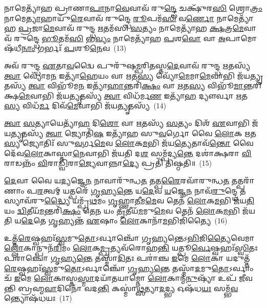 𑌨𑌾𑌮𑍇𑌤𑍍𑌯𑌾᳴𑌹 𑌪𑍍𑌰𑌾𑌣𑌾\-\ul{𑌪𑌾}\-𑌨𑌾\-\ul{𑌵𑍇}\-𑌵𑌾𑌵᳴ 𑌰𑍁\-\ul{𑌨𑍍𑌦𑍍𑌧𑍇} 𑌚𑌕𑍍𑌷𑍁᳴𑌰\-\ul{𑌸𑌿} 𑌶𑍍𑌰𑍋\-\ul{𑌤𑍍𑌰𑌂} 𑌨𑌾𑌮𑍇\-\ul{𑌤𑍍𑌯𑌾}\-𑌹𑌾𑌯𑍁᳴\-\ul{𑌰𑍇}\-𑌵𑌾𑌵᳴ 𑌰𑍁𑌨𑍍𑌦𑍍𑌧𑍇 \ul{𑌰𑍂}\-𑌪𑌮᳴\-\ul{𑌸𑌿} 𑌵\-\ul{𑌰𑍍𑌣𑍋} 𑌨𑌾𑌮𑍇𑌤𑍍𑌯𑌾᳴𑌹 \ul{𑌪𑍍𑌰}\-𑌜𑌾\-\ul{𑌮𑍇}\-𑌵𑌾𑌵᳴ 𑌰𑍁𑌨𑍍𑌦𑍍𑌧 \ul{𑌋}\-𑌤𑌮᳴𑌸𑌿 \ul{𑌸}\-𑌤𑍍𑌯𑌂 𑌨𑌾𑌮𑍇𑌤𑍍𑌯𑌾᳴𑌹 \ul{𑌕𑍍𑌷}\-𑌤𑍍𑌰\-\ul{𑌮𑍇}\-𑌵𑌾𑌵᳴ 𑌰𑍁𑌨𑍍𑌦𑍍𑌧𑍇 \ul{𑌭𑍂}\-𑌤𑌮᳴\-\ul{𑌸𑌿} 𑌭\-\ul{𑌵𑍍𑌯𑌂} 𑌨𑌾𑌮𑍇𑌤𑍍𑌯𑌾᳴𑌹 \ul{𑌪}\-𑌶\-\ul{𑌵𑍋} 𑌵𑌾 \ul{𑌅}\-𑌪𑌾𑌮𑍋𑌷᳴𑌧𑍀\-\ul{𑌨𑌾𑌂} 𑌗𑌰𑍍𑌭𑌃᳴ \ul{𑌪}\-𑌶𑍂\-\ul{𑌨𑍇}\-𑌵~(13)

𑌅𑌵᳴ 𑌰𑍁𑌨𑍍𑌦𑍍𑌧 \ul{𑌏}\-𑌤𑌾\-\ul{𑌵}\-𑌦𑍍𑌵𑍈 𑌪𑍁𑌰𑍁᳴𑌷\-\ul{𑌮𑍍𑌪}\-𑌰𑌿\-\ul{𑌤}\-𑌸𑍍𑌤\-\ul{𑌦𑍇}\-𑌵𑌾𑌵᳴ 𑌰𑍁𑌨𑍍𑌦𑍍𑌧 \ul{𑌋}\-𑌤𑌸𑍍𑌯᳴ \ul{𑌤𑍍𑌵𑌾} 𑌵𑍍𑌯𑍋᳴𑌮\-\ul{𑌨} 𑌇𑌤𑍍𑌯𑌾᳴\-\ul{𑌹𑍇}\-𑌯𑌂 𑌵𑌾 \ul{𑌋}\-𑌤\-\ul{𑌸𑍍𑌯} 𑌵𑍍𑌯𑍋᳴\-\ul{𑌮𑍇}\-𑌮𑌾\-\ul{𑌮𑍇}\-𑌵𑌾𑌭𑌿 𑌜᳴𑌯\-\ul{𑌤𑍍𑌯𑍃}\-𑌤𑌸𑍍𑌯᳴ \ul{𑌤𑍍𑌵𑌾} 𑌵𑌿𑌭𑍂᳴𑌮\-\ul{𑌨} 𑌇𑌤𑍍𑌯𑌾᳴\-\ul{𑌹𑌾}\-𑌨𑍍𑌤𑌰𑌿᳴\-\ul{𑌕𑍍𑌷𑌂} 𑌵𑌾 \ul{𑌋}\-𑌤\-\ul{𑌸𑍍𑌯} 𑌵𑌿𑌭𑍂᳴\-\ul{𑌮𑌾}\-𑌨𑍍𑌤𑌰𑌿᳴𑌕𑍍𑌷\-\ul{𑌮𑍇}\-𑌵𑌾𑌭𑌿 𑌜᳴𑌯\-\ul{𑌤𑍍𑌯𑍃}\-𑌤𑌸𑍍𑌯᳴ \ul{𑌤𑍍𑌵𑌾} 𑌵𑌿𑌧᳴𑌰𑍍𑌮\-\ul{𑌣} 𑌇𑌤𑍍𑌯𑌾᳴\-\ul{𑌹} 𑌦𑍍𑌯𑍗𑌰𑍍𑌵𑌾 \ul{𑌋}\-𑌤\-\ul{𑌸𑍍𑌯} 𑌵𑌿𑌧᳴\-\ul{𑌰𑍍𑌮} 𑌦𑌿𑌵᳴\-\ul{𑌮𑍇}\-𑌵𑌾𑌭𑌿 𑌜᳴𑌯\-\ul{𑌤𑍍𑌯𑍃}\-𑌤𑌸𑍍𑌯᳴~(14)

\-\ul{𑌤𑍍𑌵𑌾} \ul{𑌸}\-𑌤𑍍𑌯𑌾𑌯𑍇𑌤𑍍𑌯𑌾᳴\-\ul{𑌹} 𑌦𑌿\-\ul{𑌶𑍋} 𑌵𑌾 \ul{𑌋}\-𑌤𑌸𑍍𑌯᳴ \ul{𑌸}\-𑌤𑍍𑌯𑌂 𑌦𑌿𑌶᳴ \ul{𑌏}\-𑌵𑌾𑌭𑌿 𑌜᳴𑌯\-\ul{𑌤𑍍𑌯𑍃}\-𑌤𑌸𑍍𑌯᳴ \ul{𑌤𑍍𑌵𑌾} 𑌜𑍍𑌯𑍋𑌤𑌿᳴\-\ul{𑌷} 𑌇𑌤𑍍𑌯𑌾᳴𑌹 𑌸𑍁\-\ul{𑌵}\-𑌰𑍍𑌗𑍋 𑌵𑍈 \ul{𑌲𑍋}\-𑌕 \ul{𑌋}\-𑌤\-\ul{𑌸𑍍𑌯} 𑌜𑍍𑌯𑍋𑌤𑌿𑌃᳴ 𑌸𑍁\-\ul{𑌵}\-𑌰𑍍𑌗\-\ul{𑌮𑍇}\-𑌵 \ul{𑌲𑍋}\-𑌕\-\ul{𑌮}\-𑌭𑌿 𑌜᳴𑌯\-\ul{𑌤𑍍𑌯𑍇}\-𑌤𑌾𑌵᳴\-\ul{𑌨𑍍𑌤𑍋} 𑌵𑍈 𑌦𑍇᳴𑌵\-\ul{𑌲𑍋}\-𑌕𑌾𑌸𑍍𑌤𑌾\-\ul{𑌨𑍇}\-𑌵𑌾𑌭𑌿 𑌜᳴𑌯𑌤𑌿 𑌦\-\ul{𑌶} 𑌸𑌮𑍍𑌪᳴𑌦𑍍𑌯\-\ul{𑌨𑍍𑌤𑍇} 𑌦𑌶𑌾॑𑌕𑍍𑌷𑌰𑌾 \ul{𑌵𑌿}\-𑌰𑌾𑌡𑌨𑍍𑌨𑌂᳴ \ul{𑌵𑌿}\-𑌰𑌾\-\ul{𑌡𑍍𑌵𑌿}\-𑌰𑌾\-\ul{𑌜𑍍𑌯𑍇}\-𑌵𑌾𑌨𑍍𑌨𑌾\-\ul{𑌦𑍍𑌯𑍇} 𑌪𑍍𑌰𑌤𑌿᳴ 𑌤𑌿𑌷𑍍𑌠𑌤𑌿॥~(15)

{\anuvakamend[{𑌵𑍍𑌯𑍋᳴𑌮𑌨 \ul{𑌋}\-𑌤𑌸𑍍𑌯᳴ \ul{𑌪𑍍𑌰𑌾}\-𑌣𑌃 \ul{𑌪}\-𑌶𑍂\-\ul{𑌨𑍇}\-𑌵 𑌵𑌿𑌧᳴\-\ul{𑌰𑍍𑌮} 𑌦𑌿𑌵᳴\-\ul{𑌮𑍇}\-𑌵𑌾𑌭𑌿 𑌜᳴𑌯\-\ul{𑌤𑍍𑌯𑍃}\-𑌤\-\ul{𑌸𑍍𑌯} 𑌷𑌟𑍍𑌚᳴𑌤𑍍𑌵𑌾𑌰𑌿𑍞𑌶𑌚𑍍𑌚}]}%

\-\ul{𑌦𑍇}\-𑌵𑌾 𑌵𑍈 𑌯\-\ul{𑌦𑍍𑌯}\-𑌜𑍍𑌞𑍇\-\ul{𑌨} 𑌨𑌾𑌵𑌾𑌰𑍁᳴𑌨𑍍𑌧\-\ul{𑌤} 𑌤𑌤𑍍𑌪\-\ul{𑌰𑍈}\-𑌰𑌵𑌾᳴𑌰𑍁𑌨𑍍𑌧\-\ul{𑌤} 𑌤𑌤𑍍𑌪𑌰𑌾᳴𑌣𑌾𑌂 𑌪\-\ul{𑌰}\-𑌤𑍍𑌵𑌮𑍍 𑌯𑌤𑍍𑌪𑌰𑍇᳴ \ul{𑌗𑍃}\-𑌹𑍍𑌯\-\ul{𑌨𑍍𑌤𑍇} 𑌯\-\ul{𑌦𑍇}\-𑌵 \ul{𑌯}\-𑌜𑍍𑌞𑍇\-\ul{𑌨} 𑌨𑌾𑌵᳴\-\ul{𑌰𑍁}\-𑌨𑍍𑌦𑍍𑌧𑍇 𑌤𑌸𑍍𑌯𑌾𑌵᳴𑌰𑍁\-\ul{𑌦𑍍𑌧𑍍𑌯𑍈} 𑌯𑌮𑍍𑌪𑍍𑌰᳴\-\ul{𑌥}\-𑌮𑌂 \ul{𑌗𑍃}\-𑌹𑍍𑌣𑌾\-\ul{𑌤𑍀}\-𑌮\-\ul{𑌮𑍇}\-𑌵 𑌤𑍇𑌨᳴ \ul{𑌲𑍋}\-𑌕\-\ul{𑌮}\-𑌭𑌿 𑌜᳴𑌯\-\ul{𑌤𑌿} 𑌯𑌂 \ul{𑌦𑍍𑌵𑌿}\-𑌤𑍀𑌯᳴\-\ul{𑌮}\-𑌨𑍍𑌤𑌰𑌿᳴\-\ul{𑌕𑍍𑌷𑌂} 𑌤𑍇\-\ul{𑌨} 𑌯𑌂 \ul{𑌤𑍃}\-𑌤𑍀𑌯᳴\-\ul{𑌮}\-𑌮𑍁\-\ul{𑌮𑍇}\-𑌵 𑌤𑍇𑌨᳴ \ul{𑌲𑍋}\-𑌕\-\ul{𑌮}\-𑌭𑌿 𑌜᳴𑌯𑌤𑌿 𑌯\-\ul{𑌦𑍇}\-𑌤𑍇 \ul{𑌗𑍃}\-𑌹𑍍𑌯𑌨𑍍𑌤᳴ \ul{𑌏}\-𑌷𑌾𑌂 \ul{𑌲𑍋}\-𑌕𑌾𑌨𑌾᳴\-\ul{𑌮}\-𑌭𑌿𑌜𑌿᳴𑌤𑍍𑌯𑍈~(16)

𑌉𑌤𑍍𑌤᳴\-\ul{𑌰𑍇}\-𑌷𑍍𑌵𑌹𑌃᳴\-\ul{𑌸𑍍𑌵}\-𑌮𑍁\-\ul{𑌤𑍋}\-\-𑌽𑌰𑍍𑌵𑌾𑌞𑍍𑌚𑍋᳴ 𑌗𑍃𑌹𑍍𑌯𑌨𑍍𑌤𑍇\-𑌽\-\ul{𑌭𑌿}\-𑌜𑌿\-\ul{𑌤𑍍𑌯𑍈}\-𑌵𑍇𑌮𑌾\-\ul{𑌲𑍍𑌲𑍋𑌁}\-𑌕𑌾𑌨𑍍𑌪𑍁𑌨᳴\-\ul{𑌰𑌿}\-𑌮𑌂 \ul{𑌲𑍋}\-𑌕\-\ul{𑌮𑍍𑌪𑍍𑌰}\-𑌤𑍍𑌯𑌵᳴𑌰𑍋𑌹\-\ul{𑌨𑍍𑌤𑌿} 𑌯𑌤𑍍𑌪𑍂\-\ul{𑌰𑍍𑌵𑍇}\-𑌷𑍍𑌵𑌹𑌃᳴\-\ul{𑌸𑍍𑌵𑌿}\-𑌤𑌃 𑌪𑌰𑌾॑𑌞𑍍𑌚𑍋 \ul{𑌗𑍃}\-𑌹𑍍𑌯\-\ul{𑌨𑍍𑌤𑍇} 𑌤𑌸𑍍𑌮𑌾᳴\-\ul{𑌦𑌿}\-𑌤𑌃 𑌪𑌰𑌾॑𑌞𑍍𑌚 \ul{𑌇}\-𑌮𑍇 \ul{𑌲𑍋}\-𑌕𑌾 𑌯𑌦𑍁𑌤𑍍𑌤᳴\-\ul{𑌰𑍇}\-𑌷𑍍𑌵𑌹𑌃᳴\-\ul{𑌸𑍍𑌵}\-𑌮𑍁\-\ul{𑌤𑍋}\-\-𑌽𑌰𑍍𑌵𑌾𑌞𑍍𑌚𑍋᳴ \ul{𑌗𑍃}\-𑌹𑍍𑌯\-\ul{𑌨𑍍𑌤𑍇} 𑌤𑌸𑍍𑌮𑌾᳴\-\ul{𑌦}\-𑌮𑍁\-\ul{𑌤𑍋}\-\-𑌽𑌰𑍍𑌵𑌾𑌂 𑌚᳴ \ul{𑌇}\-𑌮𑍇 \ul{𑌲𑍋}\-𑌕𑌾𑌸𑍍𑌤\-\ul{𑌸𑍍𑌮𑌾}\-𑌦\-𑌯𑌾᳴𑌤𑌯𑌾𑌮𑍍𑌨𑍋 \ul{𑌲𑍋}\-𑌕𑌾𑌨𑍍𑌮᳴\-\ul{𑌨𑍁}\-𑌷𑍍𑌯𑌾᳴ 𑌉𑌪᳴ 𑌜𑍀𑌵𑌨𑍍𑌤𑌿 𑌬𑍍𑌰𑌹𑍍𑌮\-\ul{𑌵𑌾}\-𑌦𑌿𑌨𑍋᳴ 𑌵𑌦\-\ul{𑌨𑍍𑌤𑌿} 𑌕𑌸𑍍𑌮𑌾॑\-\ul{𑌥𑍍𑌸}\-𑌤𑍍𑌯𑌾\-\ul{𑌦}\-𑌦𑍍𑌭𑍍𑌯 𑌓𑌷᳴𑌧\-\ul{𑌯𑌃} 𑌸𑌮𑍍𑌭᳴\-\ul{𑌵}\-𑌨𑍍𑌤𑍍𑌯𑍋𑌷᳴𑌧𑌯𑌃~(17)

